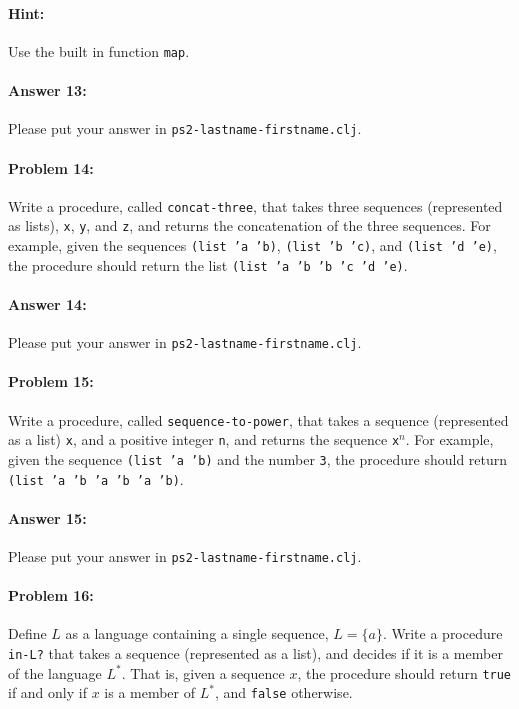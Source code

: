 \documentclass[10pt]{article}
\newcommand{\PSnum}{2}
\begin{document}
\paragraph{Hint:}
  Use the built in function \texttt{map}.

\paragraph{Answer 13:} Please put your answer in \texttt{ps\PSnum-lastname-firstname.clj}.

\noindent\hrulefill %

\paragraph{Problem 14:}
Write a procedure, called \texttt{concat-three}, that takes three
sequences (represented as lists), \texttt{x}, \texttt{y}, and
\texttt{z}, and returns the concatenation of the three sequences. For
example, given the sequences \texttt{(list 'a 'b)}, \texttt{(list 'b
  'c)}, and \texttt{(list 'd 'e)}, the procedure should return the list
\texttt{(list 'a 'b 'b 'c 'd 'e)}.

\paragraph{Answer 14:} Please put your answer in \texttt{ps\PSnum-lastname-firstname.clj}.

\noindent\hrulefill %

\paragraph{Problem 15:}
Write a procedure, called \texttt{sequence-to-power}, that takes a
sequence (represented as a list) \texttt{x}, and a positive integer
\texttt{n}, and returns the sequence \texttt{x}$^n$. For
example, given the sequence \texttt{(list 'a 'b)} and the number
\texttt{3}, the procedure should return 
\texttt{(list 'a 'b 'a 'b 'a 'b)}.

\paragraph{Answer 15:} Please put your answer in
\texttt{ps\PSnum-lastname-firstname.clj}.

\noindent\hrulefill %

\paragraph{Problem 16:}
Define $L$ as a language containing a single sequence,
$L=\{a\}$. Write a procedure \texttt{in-L?} that takes a sequence
(represented as a list), and decides if it is a member of the language
$L^*$. That is, given a sequence $x$, the procedure should return
\texttt{true} if and only if $x$ is a member of $L^*$, and
\texttt{false} otherwise.
\end{document}
